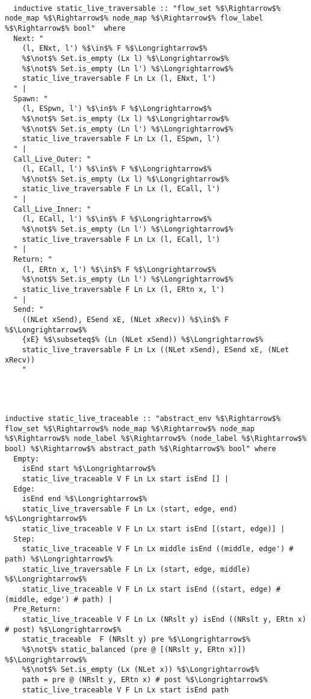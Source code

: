 \documentclass{article}
\begin{document}
\begin{lstlisting}[style=codestyle1, escapechar=\%]

  inductive static_live_traversable :: "flow_set %$\Rightarrow$% node_map %$\Rightarrow$% node_map %$\Rightarrow$% flow_label %$\Rightarrow$% bool"  where
  Next: "
    (l, ENxt, l') %$\in$% F %$\Longrightarrow$%
    %$\not$% Set.is_empty (Lx l) %$\Longrightarrow$%
    %$\not$% Set.is_empty (Ln l') %$\Longrightarrow$%
    static_live_traversable F Ln Lx (l, ENxt, l')
  " |
  Spawn: "
    (l, ESpwn, l') %$\in$% F %$\Longrightarrow$%
    %$\not$% Set.is_empty (Lx l) %$\Longrightarrow$%
    %$\not$% Set.is_empty (Ln l') %$\Longrightarrow$%
    static_live_traversable F Ln Lx (l, ESpwn, l')
  " |
  Call_Live_Outer: "
    (l, ECall, l') %$\in$% F %$\Longrightarrow$%
    %$\not$% Set.is_empty (Lx l) %$\Longrightarrow$%
    static_live_traversable F Ln Lx (l, ECall, l')
  " |
  Call_Live_Inner: "
    (l, ECall, l') %$\in$% F %$\Longrightarrow$%
    %$\not$% Set.is_empty (Ln l') %$\Longrightarrow$%
    static_live_traversable F Ln Lx (l, ECall, l')
  " |
  Return: "
    (l, ERtn x, l') %$\in$% F %$\Longrightarrow$%
    %$\not$% Set.is_empty (Ln l') %$\Longrightarrow$%
    static_live_traversable F Ln Lx (l, ERtn x, l')
  " |
  Send: "
    ((NLet xSend), ESend xE, (NLet xRecv)) %$\in$% F %$\Longrightarrow$%
    {xE} %$\subseteq$% (Ln (NLet xSend)) %$\Longrightarrow$%
    static_live_traversable F Ln Lx ((NLet xSend), ESend xE, (NLet xRecv))
    "
    
  \end{lstlisting}


\begin{lstlisting}[style=codestyle1, escapechar=\%]

  
inductive static_live_traceable :: "abstract_env %$\Rightarrow$% flow_set %$\Rightarrow$% node_map %$\Rightarrow$% node_map %$\Rightarrow$% node_label %$\Rightarrow$% (node_label %$\Rightarrow$% bool) %$\Rightarrow$% abstract_path %$\Rightarrow$% bool" where
  Empty:
    isEnd start %$\Longrightarrow$%
    static_live_traceable V F Ln Lx start isEnd [] |
  Edge:
    isEnd end %$\Longrightarrow$%
    static_live_traversable F Ln Lx (start, edge, end) %$\Longrightarrow$%
    static_live_traceable V F Ln Lx start isEnd [(start, edge)] |
  Step:
    static_live_traceable V F Ln Lx middle isEnd ((middle, edge') # path) %$\Longrightarrow$%
    static_live_traversable F Ln Lx (start, edge, middle) %$\Longrightarrow$%
    static_live_traceable V F Ln Lx start isEnd ((start, edge) # (middle, edge') # path) |
  Pre_Return:
    static_live_traceable V F Ln Lx (NRslt y) isEnd ((NRslt y, ERtn x) # post) %$\Longrightarrow$%
    static_traceable  F (NRslt y) pre %$\Longrightarrow$%
    %$\not$% static_balanced (pre @ [(NRslt y, ERtn x)]) %$\Longrightarrow$%
    %$\not$% Set.is_empty (Lx (NLet x)) %$\Longrightarrow$%
    path = pre @ (NRslt y, ERtn x) # post %$\Longrightarrow$%
    static_live_traceable V F Ln Lx start isEnd path
    
  \end{lstlisting}
\end{document}
